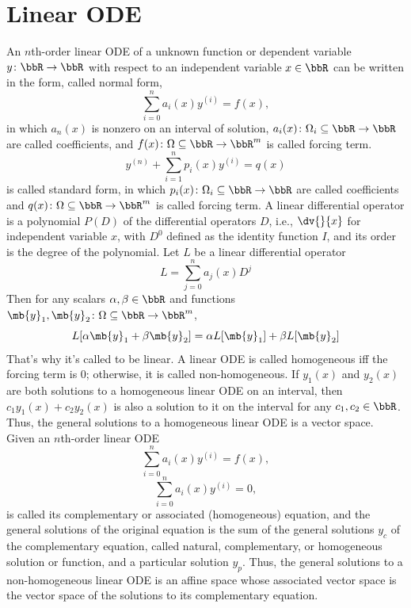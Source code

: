 \documentclass[a4paper,12pt]{report}
\begin{document}
\section{Linear ODE}
An $n$th-order linear ODE of a unknown function or dependent variable $y\colon\bbR\to\bbR$ with respect to an independent variable $x\in\bbR$ can be written in the form, called normal form,
\[\sum_{i=0}^na_i(x)y^{(i)}=f(x),\]
in which $a_n(x)$ is nonzero on an interval of solution, $a_i(x)\colon\Omega_i\subseteq\bbR\to\bbR$ are called coefficients, and $f(x)\colon\Omega\subseteq\bbR\to\bbR^m$ is called forcing term.
\[y^{(n)}+\sum_{i=1}^np_i(x)y^{(i)}=q(x)\]
is called standard form, in which $p_i(x)\colon\Omega_i\subseteq\bbR\to\bbR$ are called coefficients and $q(x)\colon\Omega\subseteq\bbR\to\bbR^m$ is called forcing term.
A linear differential operator is a polynomial $P(D)$ of the differential operators $D$, i.e., $\dv{}{x}$ for independent variable $x$, with $D^0$ defined as the identity function $I$, and its order is the degree of the polynomial.
Let $L$ be a linear differential operator
\[L=\sum_{j=0}^na_j(x)D^j\]
Then for any scalars $\alpha,\beta\in\bbR$ and functions $\mb{y}_1,\mb{y}_2\colon\Omega\subseteq\bbR\to\bbR^m$,
\[L[\alpha\mb{y}_1+\beta\mb{y}_2]=\alpha L[\mb{y}_1]+\beta L[\mb{y}_2]\]
That's why it's called to be linear.
A linear ODE is called homogeneous iff the forcing term is 0; otherwise, it is called non-homogeneous.
If $y_1(x)$ and $y_2(x)$ are both solutions to a homogeneous linear ODE on an interval, then $c_1y_1(x)+c_2y_2(x)$ is also a solution to it on the interval for any $c_1,c_2\in\bbR$. Thus, the general solutions to a homogeneous linear ODE is a vector space.
Given an $n$th-order linear ODE
\[\sum_{i=0}^na_i(x)y^{(i)}=f(x),\]
\[\sum_{i=0}^na_i(x)y^{(i)}=0,\]
is called its complementary or associated (homogeneous) equation, and the general solutions of the original equation is the sum of the general solutions $y_c$ of the complementary equation, called natural, complementary, or homogeneous solution or function, and a particular solution $y_p$. Thus, the general solutions to a non-homogeneous linear ODE is an affine space whose associated vector space is the vector space of the solutions to its complementary equation.
\end{document}

